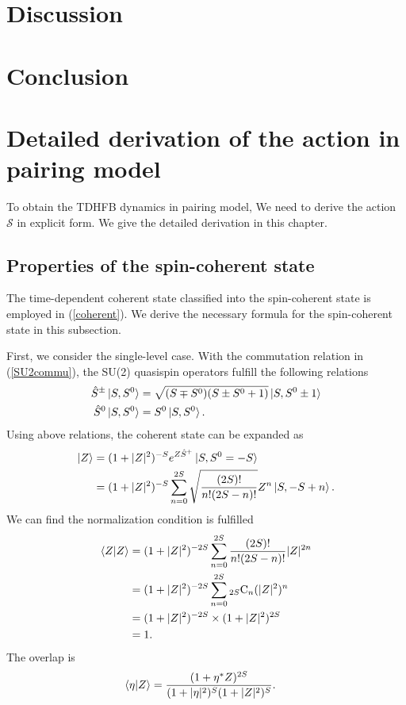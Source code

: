 \documentclass[11pt]{book} %
\begin{document}
\chapter{Discussion}

\chapter{Conclusion}

\appendix


\chapter{Detailed derivation of the action in pairing model}
To obtain the TDHFB dynamics in pairing model, We need to derive the action $\mathcal{S}$ in explicit form. We give the detailed derivation in this chapter.

\section{Properties of the spin-coherent state}
The time-dependent coherent state classified into the spin-coherent state is employed in (\ref{coherent}). We derive the necessary formula for the spin-coherent state in this subsection. \par
First, we consider the single-level case.
With the commutation relation in (\ref{SU2commu}), the SU(2) quasispin operators fulfill the following relations
\begin{align}
  \hat{S}^{\pm}\ket{S,S^0} &= \sqrt{(S\mp S^0)(S\pm S^0+1)} \ket{S,S^0\pm 1}
  \label{S_pm} \\
  \hat{S}^0\ket{S,S^0} &= S^0\ket{S,S^0} .
  \label{S_0}
\end{align}
Using above relations, the coherent state can be expanded as 
\begin{align}
  \ket{Z} &= (1+|Z|^2)^{-S}e^{Z \hat{S}^+}\ket{S,S^0=-S} \nonumber \\
  &= (1+|Z|^2)^{-S}\sum_{n=0}^{2S}\sqrt{\frac{(2S)!}{n!(2S-n)!}}Z^n\ket{S,-S+n} .
\end{align}
We can find the normalization condition is fulfilled
\begin{align}
  \braket{Z|Z} &= (1+|Z|^2)^{-2S}\sum_{n=0}^{2S}\frac{(2S)!}{n!(2S-n)!}|Z|^{2n} \nonumber \\
  &= (1+|Z|^2)^{-2S}\sum_{n=0}^{2S} {}_{2S}\mathrm{C}_n(|Z|^2)^n \nonumber \\
  &= (1+|Z|^2)^{-2S}\times(1+|Z|^2)^{2S} \nonumber \\
  &= 1 .
\end{align}
The overlap is
\begin{align}
  \braket{\eta|Z} &= \frac{(1+\eta^*Z)^{2S}}{(1+|\eta|^2)^S(1+|Z|^2)^S} .
\end{align}
\end{document}
